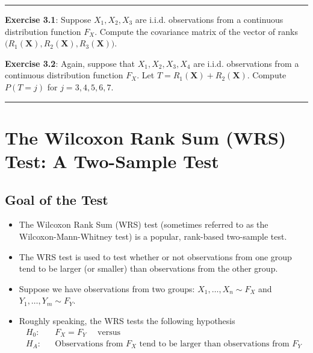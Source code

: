 \documentclass[]{book}
\begin{document}
\begin{center}\rule{0.5\linewidth}{\linethickness}\end{center}

\textbf{Exercise 3.1}: Suppose \(X_{1}, X_{2}, X_{3}\) are i.i.d. observations from a continuous
distribution function \(F_{X}\). Compute the covariance matrix of the vector
of ranks \(\big( R_{1}(\mathbf{X}), R_{2}(\mathbf{X}), R_{3}( \mathbf{X} ) \big)\).

\textbf{Exercise 3.2}: Again, suppose that \(X_{1}, X_{2}, X_{3}, X_{4}\) are i.i.d. observations from a continuous
distribution function \(F_{X}\). Let \(T= R_{1}( \mathbf{X} ) + R_{2}(\mathbf{X})\). Compute \(P( T = j )\)
for \(j = 3, 4, 5, 6, 7\).

\begin{center}\rule{0.5\linewidth}{\linethickness}\end{center}

\hypertarget{the-wilcoxon-rank-sum-wrs-test-a-two-sample-test}{%
\section{The Wilcoxon Rank Sum (WRS) Test: A Two-Sample Test}\label{the-wilcoxon-rank-sum-wrs-test-a-two-sample-test}}

\hypertarget{goal-of-the-test}{%
\subsection{Goal of the Test}\label{goal-of-the-test}}

\begin{itemize}
\item
  The Wilcoxon Rank Sum (WRS) test (sometimes referred to as the Wilcoxon-Mann-Whitney test) is a popular,
  rank-based two-sample test.
\item
  The WRS test is used to test whether or not observations from one group tend to be larger (or smaller) than observations
  from the other group.
\item
  Suppose we have observations from two groups: \(X_{1}, \ldots, X_{n} \sim F_{X}\) and \(Y_{1}, \ldots, Y_{m} \sim F_{Y}\).
\item
  Roughly speaking, the WRS tests the following hypothesis
  \begin{eqnarray}
  H_{0}: && F_{X} = F_{Y} \quad \textrm{ versus }  \\
  H_{A}: && \textrm{Observations from } F_{X} \textrm{ tend to be larger than observations from } F_{Y} \nonumber
  \label{eq:general-wilcoxon-hypothesis}
  \end{eqnarray}
\end{itemize}
\end{document}
